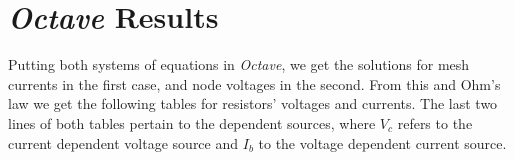 \section{\textit{Octave} Results}
Putting both systems of equations in \textit{Octave}, we get the solutions for mesh currents in the first case, and node voltages in the second. From this and Ohm's law we get the following tables for resistors' voltages and currents. The last two lines of both tables pertain to the dependent sources, where $V_c$ refers to the current dependent voltage source and $I_b$ to the voltage dependent current source.
 
